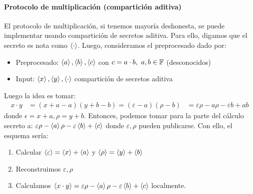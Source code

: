   \paragraph{Protocolo de multiplicación (compartición aditiva)}
  El protocolo de multiplicación, si tenemos mayoría deshonesta, se puede implementar usando compartición de secretos 
  aditiva.
  Para ello, digamos que el secreto es nota como $\left\langle \cdot \right\rangle$.
  Luego, consideramos el preprocesado dado por:
  \begin{itemize}
    \item Preprocesado: $\left\langle a \right\rangle,\left\langle b \right\rangle, \left\langle c \right\rangle$ con $c = a\cdot b,\ a,b \in \mathbb{F}$ (desconocidos)
    \item Input: $\left\langle x \right\rangle, \left\langle y \right\rangle, \left\langle \cdot \right\rangle$ compartición de secretos aditiva
  \end{itemize}
  Luego la idea es tomar:
  \begin{equation*}
    \begin{aligned}
      x \cdot y &= (x + a - a)(y + b - b) = (\varepsilon - a)(\rho - b) 
                &= \varepsilon\rho - a\rho - \varepsilon b + ab
    \end{aligned}
  \end{equation*}
  donde $\epsilon = x + a, \rho = y + b$.
  Entonces, podemos tomar para la parte del cálculo secreto a: $\varepsilon \rho - \left\langle a \right\rangle\rho - \varepsilon \left\langle b \right\rangle + \left\langle c \right\rangle$
  donde $\varepsilon, \rho$ pueden publicarse.
  Con ello, el esquema sería:
  \begin{enumerate}
    \item Calcular $\left\langle \varepsilon \right\rangle = \left\langle x \right\rangle + \left\langle a \right\rangle$ y $\left\langle \rho \right\rangle = \left\langle y \right\rangle + \left\langle b \right\rangle$
    \item Reconstruimos $\varepsilon, \rho$
    \item Calculamos $\left\langle x \cdot y \right\rangle = \varepsilon\rho - \left\langle a \right\rangle\rho - \varepsilon\left\langle b \right\rangle + \left\langle c \right\rangle$ localmente.
  \end{enumerate}

